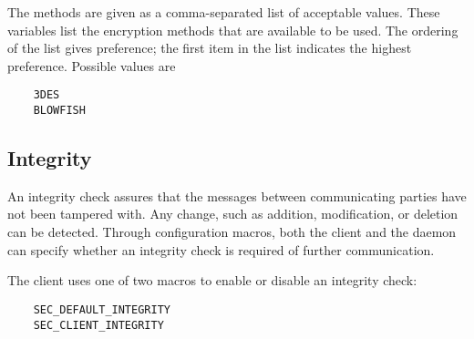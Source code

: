 The methods are
given as a comma-separated list of acceptable values.
These variables list the encryption methods that are available
to be used.
The ordering of the list gives preference;
the first item in the list indicates the highest preference.
Possible values are
\begin{verbatim}
    3DES
    BLOWFISH
\end{verbatim}

\subsection{\label{sec:Security-Integrity}Integrity}

An integrity check assures that the messages between communicating parties
have not been tampered with.
Any change, such as addition, modification, or deletion can
be detected.
Through configuration macros, both the client and the daemon
can specify whether an integrity check is required of further communication.

The client uses one of two macros to enable or disable an integrity check:
\begin{verbatim}
    SEC_DEFAULT_INTEGRITY
    SEC_CLIENT_INTEGRITY
\end{verbatim}

